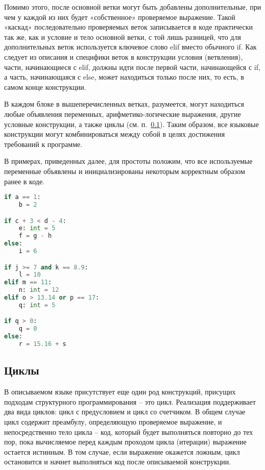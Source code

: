 Помимо этого, после основной ветки могут быть добавлены дополнительные, при чем у каждой из них будет «собственное» проверяемое выражение.
Такой «каскад» последовательно проверяемых веток записывается в коде практически так же, как и условие и тело основной ветки, с той лишь разницей, что для дополнительных веток используется ключевое слово elif вместо обычного if. Как следует из описания и специфики веток в конструкции условия (ветвления), части, начинающиеся с elif, должны идти после первой части, начинающейся с if, а часть, начинающаяся с else, может находиться только после них, то есть, в самом конце конструкции.

В каждом блоке в вышеперечисленных ветках, разумеется, могут находиться любые объявления переменных, арифметико-логические выражения, другие условные конструкции, а также циклы (см. п.~\ref{sec:loops}).
Таким образом, все языковые конструкции могут комбинироваться между собой в целях достижения требований к программе.

В примерах, приведенных далее, для простоты положим, что все используемые переменные объявлены и инициализированы некоторым корректным образом ранее в коде.

\clearpage

\begin{lstlisting}[language=Python, caption=Примеры условных конструкций]
if a == 1:
    b = 2

if c + 3 < d - 4:
    e: int = 5
    f = g - h
else:
    i = 6

if j >= 7 and k == 8.9:
    l = 10
elif m == 11:
    n: int = 12
elif o > 13.14 or p == 17:
    q: int = 5

if q > 0:
    q = 0
else:
    r = 15.16 + s
\end{lstlisting}

\subsection{Циклы}
\label{sec:loops}

В описываемом языке присутствует еще один род конструкций, присущих подходам структурного программирования -- это цикл.
Реализация поддерживает два вида циклов: цикл с предусловием и цикл со счетчиком. В общем случае цикл содержит преамбулу, определяющую проверяемое выражение, и непосредственно тело цикла -- код, который будет выполняться повторно до тех пор, пока вычисляемое перед каждым проходом цикла (итерации) выражение остается истинным.
В том случае, если выражение окажется ложным, цикл остановится и начнет выполняться код после описываемой конструкции.

